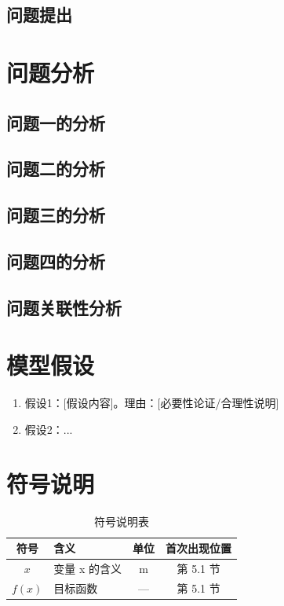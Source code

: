 \documentclass[12pt,a4paper]{article}
\begin{document}
\subsection{问题提出}  %

\section{问题分析}
\subsection{问题一的分析}  %
\subsection{问题二的分析}
\subsection{问题三的分析}
\subsection{问题四的分析}
\subsection{问题关联性分析}  %


\section{模型假设}
\begin{enumerate}
    \item 假设1：[假设内容]。理由：[必要性论证/合理性说明]
    \item 假设2：...
\end{enumerate}

\section{符号说明}
\begin{table}[H]
    \centering
    \caption{符号说明表}
    \label{tab:symbols}
    \begin{tabular}{clcc}
        \toprule
        \textbf{符号} & \textbf{含义} & \textbf{单位} & \textbf{首次出现位置} \\
        \midrule
        $x$ & 变量 x 的含义 & m & 第 5.1 节 \\
        $f(x)$ & 目标函数 & — & 第 5.1 节 \\
        \bottomrule
    \end{tabular}
\end{table}
\end{document}
